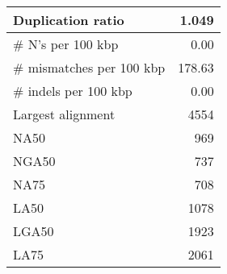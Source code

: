 \documentclass[12pt,a4paper]{article}
\begin{document}
\begin{table}[ht]
\begin{center}
\begin{tabular}{|l*{1}{|r}|}
Duplication ratio & 1.049 \\ \hline
\# N's per 100 kbp & 0.00 \\ \hline
\# mismatches per 100 kbp & 178.63 \\ \hline
\# indels per 100 kbp & 0.00 \\ \hline
Largest alignment & 4554 \\ \hline
NA50 & 969 \\ \hline
NGA50 & 737 \\ \hline
NA75 & 708 \\ \hline
LA50 & 1078 \\ \hline
LGA50 & 1923 \\ \hline
LA75 & 2061 \\ \hline
\end{tabular}
\end{center}
\end{table}
\end{document}

